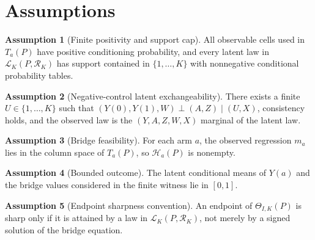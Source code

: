 \documentclass[11pt]{article}
\theoremstyle{definition}
\newtheorem{assumption}{Assumption}
\theoremstyle{plain}
\theoremstyle{remark}
\begin{document}
\section{Assumptions}
\begin{assumption}[Finite positivity and support cap]\label{ass:finite-positive}
All observable cells used in \(T_a(P)\) have positive conditioning probability, and every latent law in \(\mathcal L_K(P,\mathcal R_K)\) has support contained in \(\{1,\ldots,K\}\) with nonnegative conditional probability tables.
\end{assumption}

\begin{assumption}[Negative-control latent exchangeability]\label{ass:nc-exclusion}
There exists a finite \(U\in\{1,\ldots,K\}\) such that \((Y(0),Y(1),W)\perp(A,Z)\mid(U,X)\), consistency holds, and the observed law is the \((Y,A,Z,W,X)\) marginal of the latent law.
\end{assumption}

\begin{assumption}[Bridge feasibility]\label{ass:bridge-feasible}
For each arm \(a\), the observed regression \(m_a\) lies in the column space of \(T_a(P)\), so \(\mathcal H_a(P)\) is nonempty.
\end{assumption}

\begin{assumption}[Bounded outcome]\label{ass:bounded-y}
The latent conditional means of \(Y(a)\) and the bridge values considered in the finite witness lie in \([0,1]\).
\end{assumption}

\begin{assumption}[Endpoint sharpness convention]\label{ass:endpoint}
An endpoint of \(\Theta_{I,K}(P)\) is sharp only if it is attained by a law in \(\mathcal L_K(P,\mathcal R_K)\), not merely by a signed solution of the bridge equation.
\end{assumption}
\end{document}
